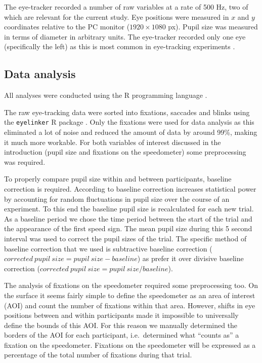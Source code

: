 The eye-tracker recorded a number of raw variables at a rate of 500 Hz, two of which are relevant for the current study.
Eye positions were measured in \(x\) and \(y\) coordinates relative to the PC monitor (\(1920 \times 1080\) px).
Pupil size was measured in terms of diameter in arbitrary units.
The eye-tracker recorded only one eye (specifically the left) as this is most common in eye-tracking experiments \citep{Hutton2019}.

\subsection{Data analysis}
All analyses were conducted using the R programming language \citep{R}.

The raw eye-tracking data were sorted into fixations, saccades and blinks using the \texttt{eyelinker} R package \citep{eyelinker}.
Only the fixations were used for data analysis as this eliminated a lot of noise and reduced the amount of data by around 99\%, making it much more workable.
For both variables of interest discussed in the introduction (pupil size and fixations on the speedometer) some preprocessing was required.

To properly compare pupil size within and between participants, baseline correction is required. 
According to \citet{Mathot2018} baseline correction increases statistical power by accounting for random fluctuations in pupil size over the course of an experiment.
To this end the baseline pupil size is recalculated for each new trial.
As a baseline period we chose the time period between the start of the trial and the appearance of the first speed sign.
The mean pupil size during this 5 second interval was used to correct the pupil sizes of the trial.
The specific method of baseline correction that we used is subtractive baseline correction (\(corrected\ pupil\ size = pupil\ size - baseline\)) 
as \citet{Mathot2018} prefer it over divisive baseline correction (\(corrected\ pupil\ size = pupil\ size / baseline\)).

The analysis of fixations on the speedometer required some preprocessing too.
On the surface it seems fairly simple to define the speedometer as an area of interest (AOI) and count the number of fixations within that area.
However, shifts in eye positions between and within participants made it impossible to universally define the bounds of this AOI.\@
For this reason we manually determined the borders of the AOI for each participant, i.e.\ determined what ``counts as'' a fixation on the speedometer.
Fixations on the speedometer will be expressed as a percentage of the total number of fixations during that trial.

